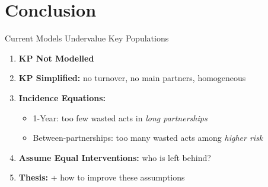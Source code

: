 \section{Conclusion}{}
\begin{frame}{Current Models Undervalue Key Populations}
  \pause
  \begin{enumerate}[<+->]
    \item \textbf{KP Not Modelled}
    \item \textbf{KP Simplified:} no turnover, no main partners, homogeneous
    \item \textbf{Incidence Equations:}
    \begin{itemize}
      \item 1-Year: too few wasted acts in \emph{long partnerships}
      \item Between-partnerships: too many wasted acts among \emph{higher risk}
    \end{itemize}
    \item \textbf{Assume Equal Interventions:} who is left behind?
    \bigskip
    \item[\rarr]\textbf{Thesis:} + how to improve these assumptions
  \end{enumerate}
\end{frame}
\newcommand{\thankscol}[1]{\parbox[t]{.33333\textwidth}{\vskip-\baselineskip#1}\ignorespaces}
\newcommand{\thankshead}[1]{\vskip.5\baselineskip\textbf{#1}}
\newcommand{\thankslogo}[3][0]{\vhskip{.5}{#1}\texttt{[image: \#3]}}
